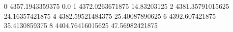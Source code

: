 0 4357.1943359375 0.0
1 4372.0263671875 14.83203125
2 4381.35791015625 24.16357421875
4 4382.59521484375 25.40087890625
6 4392.607421875 35.4130859375
8 4404.76416015625 47.56982421875

